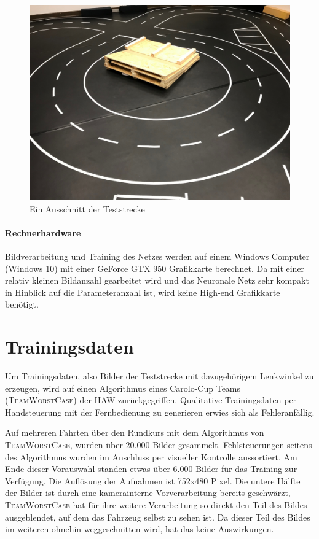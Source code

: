 \begin{figure}[h]
	\centering
	\includegraphics[scale=0.15]{figures/Teststrecke-Ausschnitt.jpg}
	\caption{Ein Ausschnitt der Teststrecke}
	\label{img:teststrecke}
\end{figure}
\paragraph{Rechnerhardware}
Bildverarbeitung und Training des Netzes werden auf einem Windows Computer (Windows 10) mit einer GeForce GTX 950 Grafikkarte berechnet. Da mit einer relativ kleinen Bildanzahl gearbeitet wird und das Neuronale Netz sehr kompakt in Hinblick auf die Parameteranzahl ist, wird keine High-end Grafikkarte benötigt.


\section{Trainingsdaten}

Um Trainingsdaten, also Bilder der Teststrecke mit dazugehörigem Lenkwinkel zu erzeugen, wird auf einen Algorithmus eines Carolo-Cup Teams (\textsc{TeamWorstCase}) der HAW zurückgegriffen. Qualitative Trainingsdaten per Handsteuerung mit der Fernbedienung zu generieren erwies sich als Fehleranfällig.

Auf mehreren Fahrten über den Rundkurs mit dem Algorithmus von \textsc{TeamWorstCase}, wurden über 20.000 Bilder gesammelt. Fehlsteuerungen seitens des Algorithmus wurden im Anschluss per visueller Kontrolle aussortiert. Am Ende dieser Vorauswahl standen etwas über 6.000 Bilder für das Training zur Verfügung. Die Auflösung der Aufnahmen ist 752x480 Pixel. Die untere Hälfte der Bilder ist durch eine kamerainterne Vorverarbeitung bereits geschwärzt, \textsc{TeamWorstCase} hat für ihre weitere Verarbeitung so direkt den Teil des Bildes ausgeblendet, auf dem das Fahrzeug selbst zu sehen ist. Da dieser Teil des Bildes im weiteren ohnehin weggeschnitten wird, hat das keine Auswirkungen. 

